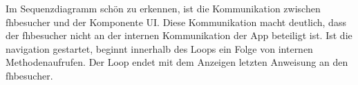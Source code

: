 \noindent Im Sequenzdiagramm schön zu erkennen, ist die Kommunikation zwischen \gls{fhbesucher} und der Komponente UI. Diese Kommunikation macht deutlich, dass der \gls{fhbesucher} nicht an der internen Kommunikation der App beteiligt ist. Ist die \gls{navigation} gestartet, beginnt innerhalb des Loops ein Folge von internen Methodenaufrufen. Der Loop endet mit dem Anzeigen letzten Anweisung an den \gls{fhbesucher}.